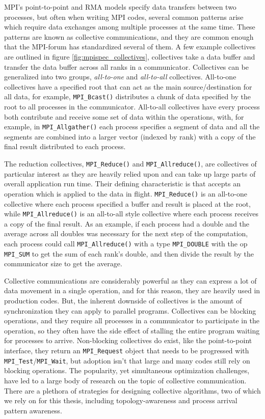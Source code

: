MPI's point-to-point and RMA models specify data transfers between two processes, but often when writing MPI codes, several common patterns arise which require data exchanges among multiple processes at the same time.
These patterns are known as collective communications, and they are common enough that the MPI-forum has standardized several of them.
A few example collectives are outlined in figure \ref{fig:mpispec_collectives}, collectives take a data buffer and transfer the data buffer across all ranks in a communicator.
Collectives can be generalized into two groups, \textit{all-to-one} and \textit{all-to-all} collectives.
All-to-one collectives have a specified root that can act as the main source/destination for all data, for example, \texttt{MPI\_Bcast()} distributes a chunk of data specified by the root to all processes in the communicator.
All-to-all collectives have every process both contribute and receive some set of data within the operations, with, for example, in \texttt{MPI\_Allgather()} each process specifies a segment of data and all the segments are combined into a larger vector (indexed by rank) with a copy of the final result distributed to each process.

The reduction collectives, \texttt{MPI\_Reduce()} and \texttt{MPI\_Allreduce()}, are collectives of particular interest as they are heavily relied upon and can take up large parts of overall application run time.
Their defining characteristic is that accepts an operation which is applied to the data in flight.
\texttt{MPI\_Reduce()} is an all-to-one collective where each process specified a buffer and result is placed at the root, while \texttt{MPI\_Allreduce()} is an all-to-all style collective where each process receives a copy of the final result. 
As an example, if each process had a double and the average across all doubles was necessary for the next step of the computation, each process could call \texttt{MPI\_Allreduce()} with a type \texttt{MPI\_DOUBLE} with the op \texttt{MPI\_SUM} to get the sum of each rank's double, and then divide the result by the communicator size to get the average.

Collective communications are considerably powerful as they can express a lot of data movement in a single operation, and for this reason, they are heavily used in production codes.
But, the inherent downside of collectives is the amount of synchronization they can apply to parallel programs. 
Collectives can be blocking operations, and they require all processes in a communicator to participate in the operation, so they often have the side effect of stalling the entire program waiting for processes to arrive.
Non-blocking collectives do exist, like the point-to-point interface, they return an \texttt{MPI\_Request} object that needs to be progressed with \texttt{MPI\_Test}/\texttt{MPI\_Wait}, but adoption isn't that large and many codes still rely on blocking operations.
The popularity, yet simultaneous optimization challenges, have led to a large body of research on the topic of collective communication. 
There are a plethora of strategies for designing collective algorithms, two of which we rely on for this thesis, including topology-awareness and process arrival pattern awareness.


